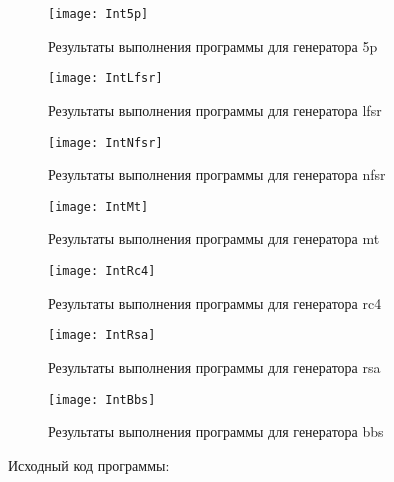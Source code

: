 \documentclass[bachelor, och, coursework]{shiza}
\begin{document}
	\begin{figure}[H]
		\centering
		\texttt{[image: Int5p]}
		\caption{Результаты выполнения программы для генератора 5p}
		\label{fig:Int5p}
	\end{figure}	
	
	\begin{figure}[H]
		\centering
		\texttt{[image: IntLfsr]}
		\caption{Результаты выполнения программы для генератора lfsr}
		\label{fig:IntLfsr}
	\end{figure}
	
	\begin{figure}[H]
		\centering
		\texttt{[image: IntNfsr]}
		\caption{Результаты выполнения программы для генератора nfsr}
		\label{fig:IntNfsr}
	\end{figure}
	
	\begin{figure}[H]
		\centering
		\texttt{[image: IntMt]}
		\caption{Результаты выполнения программы для генератора mt}
		\label{fig:IntMt}
	\end{figure}		
	
	\begin{figure}[H]
		\centering
		\texttt{[image: IntRc4]}
		\caption{Результаты выполнения программы для генератора rc4}
		\label{fig:IntRc4}
	\end{figure}
	
	\begin{figure}[H]
		\centering
		\texttt{[image: IntRsa]}
		\caption{Результаты выполнения программы для генератора rsa}
		\label{fig:IntRsa}
	\end{figure}
	
	\begin{figure}[H]
		\centering
		\texttt{[image: IntBbs]}
		\caption{Результаты выполнения программы для генератора bbs}
		\label{fig:IntBbs}
	\end{figure}
	
	Исходный код программы:
	
\end{document}
